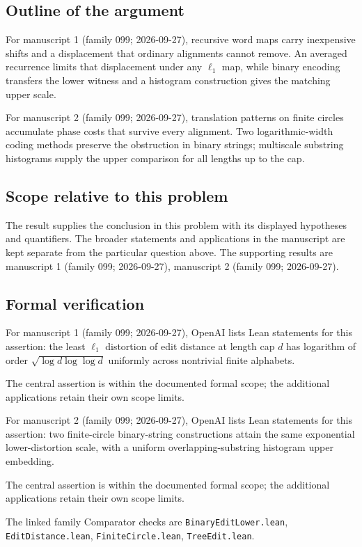 \documentclass[11pt]{article}
\begin{document}
\subsection{Outline of the argument}
For manuscript 1 (family 099; 2026-09-27), recursive word maps carry inexpensive shifts and a displacement that ordinary alignments cannot remove. An averaged recurrence limits that displacement under any $\ell_1$ map, while binary encoding transfers the lower witness and a histogram construction gives the matching upper scale.

For manuscript 2 (family 099; 2026-09-27), translation patterns on finite circles accumulate phase costs that survive every alignment. Two logarithmic-width coding methods preserve the obstruction in binary strings; multiscale substring histograms supply the upper comparison for all lengths up to the cap.

\subsection{Scope relative to this problem}
The result supplies the conclusion in this problem with its displayed hypotheses and quantifiers. The broader statements and applications in the manuscript are kept separate from the particular question above. The supporting results are manuscript 1 (family 099; 2026-09-27), manuscript 2 (family 099; 2026-09-27).

\subsection{Formal verification}
For manuscript 1 (family 099; 2026-09-27), OpenAI lists Lean statements for this assertion: the least $\ell_1$ distortion of edit distance at length cap $d$ has logarithm of order $\sqrt{\log d\log\log d}$ uniformly across nontrivial finite alphabets.

The central assertion is within the documented formal scope; the additional applications retain their own scope limits.

For manuscript 2 (family 099; 2026-09-27), OpenAI lists Lean statements for this assertion: two finite-circle binary-string constructions attain the same exponential lower-distortion scale, with a uniform overlapping-substring histogram upper embedding.

The central assertion is within the documented formal scope; the additional applications retain their own scope limits.

The linked family Comparator checks are \texttt{BinaryEditLower.lean}, \texttt{EditDistance.lean}, \texttt{FiniteCircle.lean}, \texttt{TreeEdit.lean}.
\end{document}
